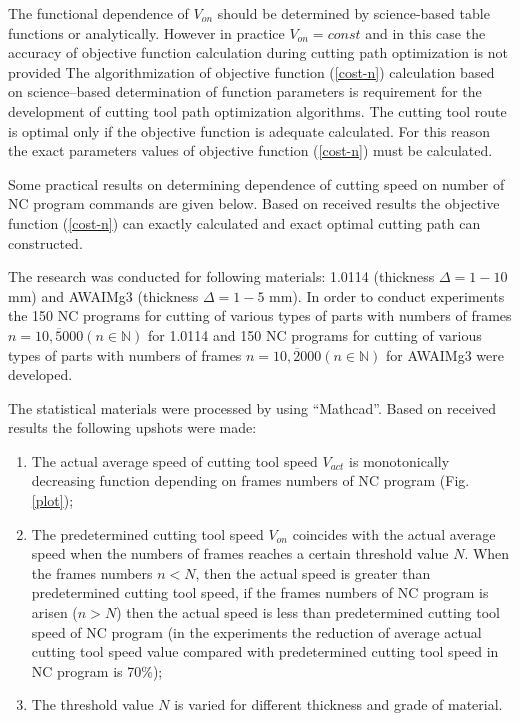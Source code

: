 \documentclass[runningheads]{llncs}
\begin{document}
The functional dependence of $V_{on}$
should be determined by science-based table functions or analytically.
However in practice
$V_{on}=const$
and in this case the accuracy of objective function calculation
during cutting path optimization is not provided
The algorithmization of objective function (\ref{cost-n})
calculation based on science–based determination of function parameters
is requirement for the development of cutting tool path optimization algorithms.
The cutting tool route is optimal only if
the objective function is adequate calculated.
For this reason the exact parameters values of objective function (\ref{cost-n})
must be calculated.

Some practical results on determining
dependence of cutting speed on number of NC program commands
are given below.
Based on received results the objective function (\ref{cost-n})
can exactly calculated and exact optimal cutting path can constructed.

The research was conducted for following materials:
1.0114 (thickness $\Delta=1-10$ mm) and
AWAIMg3 (thickness $\Delta=1-5$ mm).
In order to conduct experiments the 150 NC programs
for cutting of various types of parts with numbers of frames
$n=\overline{10, 5000}(n \in \mathbb{N})$
for 1.0114
and 150 NC programs for cutting of various types of parts with numbers of frames
$n = \overline{10, 2000} (n \in \mathbb N)$
for AWAIMg3
were developed.

The statistical materials were processed by using ``Mathcad''.
Based on received results the following upshots were made:

\begin{enumerate}
\item
The actual average speed of cutting tool speed $V_{act}$
is monotonically decreasing function depending on frames numbers of NC program
(Fig. \ref{plot});

\item
The predetermined cutting tool speed $V_{on}$
coincides with the actual average speed
when the numbers of frames reaches a certain threshold value $N$.
When the frames numbers $n < N$,
then the actual speed is greater than predetermined cutting tool speed,
if the frames numbers of NC program is arisen ($n>N$)
then the actual speed is less than
predetermined cutting tool speed of NC program
(in the experiments the reduction of average actual cutting tool speed value
compared with predetermined cutting tool speed in NC program is 70\%);

\item
The threshold value $N$ is varied for different thickness and grade of material.
\end{enumerate}
\end{document}
